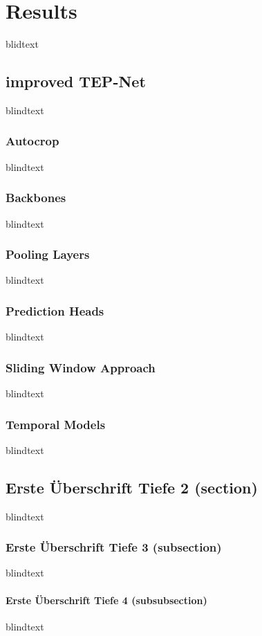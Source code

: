 \chapter{Results}
\label{sec:results}


blidtext




\section{improved TEP-Net}
blindtext

\subsection{Autocrop}
blindtext

\subsection{Backbones}
blindtext

\subsection{Pooling Layers}
blindtext

\subsection{Prediction Heads}
blindtext

\subsection{Sliding Window Approach}
blindtext

\subsection{Temporal Models}
blindtext

\section{Erste Überschrift Tiefe 2 (section)}
blindtext

\subsection{Erste Überschrift Tiefe 3 (subsection)}
blindtext

\subsubsection{Erste Überschrift Tiefe 4 (subsubsection)}
blindtext
